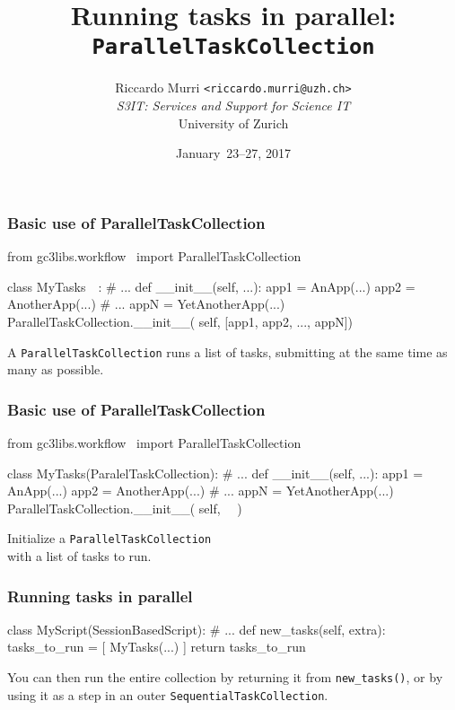 \documentclass[english,serif,mathserif,xcolor=pdftex,dvipsnames,table]{beamer}
\title[Sequencing tasks]{%
  Running tasks in parallel: \\
  \texttt{ParallelTaskCollection}
}
\author[R. Murri, S3IT UZH]{%
  Riccardo Murri \texttt{<riccardo.murri@uzh.ch>}
  \\[1ex]
  \emph{S3IT: Services and Support for Science IT}
  \\[1ex]
  University of Zurich
}
\date{January~23--27, 2017}
\begin{document}
\maketitle


\begin{frame}[fragile]
  \frametitle{Basic use of ParallelTaskCollection}

\begin{python}
from gc3libs.workflow \
  import ParallelTaskCollection

class MyTasks~~:
  # ...
  def __init__(self, ...):
    app1 = AnApp(...)
    app2 = AnotherApp(...)
    # ...
    appN = YetAnotherApp(...)
    ParallelTaskCollection.__init__(
      self, [app1, app2, ..., appN])
\end{python}

  \+ A \texttt{ParallelTaskCollection} runs a list of tasks, submitting
  at the same time as many as possible.
\end{frame}


\begin{frame}[fragile]
  \frametitle{Basic use of ParallelTaskCollection}

\begin{python}
from gc3libs.workflow \
  import ParallelTaskCollection

class MyTasks(ParalelTaskCollection):
  # ...
  def __init__(self, ...):
    app1 = AnApp(...)
    app2 = AnotherApp(...)
    # ...
    appN = YetAnotherApp(...)
    ParallelTaskCollection.__init__(
      self, ~~)
\end{python}

  \+
  Initialize a \texttt{ParallelTaskCollection} \\
  with a list of tasks to run.
\end{frame}


\begin{frame}[fragile]
  \frametitle{Running tasks in parallel}

\begin{python}
class MyScript(SessionBasedScript):
  # ...
  def new_tasks(self, extra):
    tasks_to_run = [
      MyTasks(...)
    ]
    return tasks_to_run
\end{python}

  \+ You can then run the entire collection by returning it from
  \lstinline|new_tasks()|, or by using it as a step in an outer
  \texttt{SequentialTaskCollection}.
\end{frame}
\end{document}

